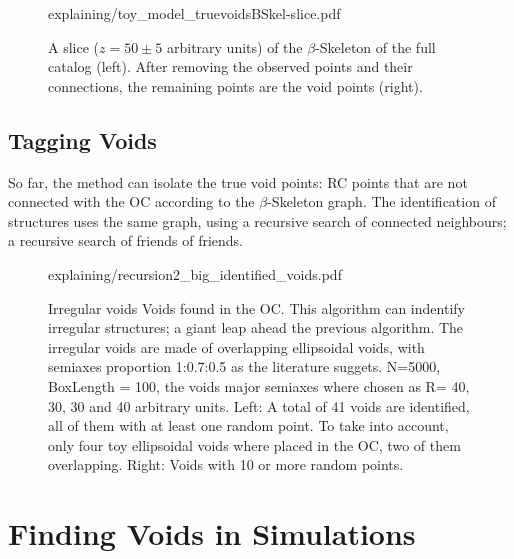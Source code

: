 \documentclass[preprint]{aastex62}
\begin{document}
\begin{figure}
          {explaining/toy_model_truevoidsBSkel-slice.pdf}
          \caption{A slice ($z=50\pm5$ arbitrary units) of the
            $\beta$-Skeleton of the full catalog (left).
            After removing the observed points and their connections, the
            remaining points are the void points (right).
            \label{fig:beta_skel_slices}}
\end{figure}

\subsection{Tagging Voids}

So far, the method can isolate the true void points: RC points that are not
connected with the OC according to the $\beta$-Skeleton graph. The
identification of structures uses the same graph, using a recursive search of
connected neighbours; a recursive search of friends of friends.

\begin{figure}
          {explaining/recursion2_big_identified_voids.pdf}
  \caption{Irregular voids Voids found in the OC. This algorithm can indentify
           irregular structures; a giant leap ahead the previous algorithm.
           The irregular voids are made of overlapping ellipsoidal voids, with
           semiaxes proportion 1:0.7:0.5 as the literature suggets.  
           N=5000, BoxLength = 100, the voids major semiaxes where chosen as
           R= 40, 30, 30 and 40 arbitrary units.
           Left: A total of 41 voids are identified, all of them with at least
           one random point. To take into account, only four toy ellipsoidal
           voids where placed in the OC, two of them overlapping.
           Right: Voids with 10 or more random points.
    \label{fig:}}
\end{figure}




\section{Finding Voids in Simulations}
\end{document}
